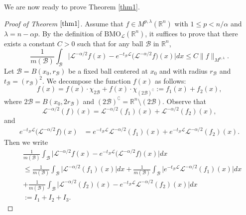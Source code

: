 \documentclass[10pt, reqno]{amsart}
\theoremstyle{definition}
\theoremstyle{remark}
\numberwithin{equation}{section}
\begin{document}
We are now ready to prove Theorem \ref{thm1}.
\begin{proof}[Proof of Theorem $\ref{thm1}$]
Assume that $f\in {M}^{p,\lambda}(\mathbb R^n)$ with $1\leq p<n/{\alpha}$ and $\lambda=n-\alpha p$. By the definition of $\mathrm{BMO}_{\mathcal{L}}(\mathbb R^n)$, it suffices to prove that there exists a constant $C>0$ such that for any ball $\mathcal{B}$ in $\mathbb R^n$,
\begin{equation}\label{main11}
\frac{1}{m(\mathcal{B})}\int_{\mathcal{B}}\big|\mathcal L^{-\alpha/2}f(x)-e^{-t_{\mathcal{B}}\mathcal{L}}
\big(\mathcal L^{-\alpha/2}f\big)(x)\big|dx\leq C\big\|f\big\|_{M^{p,\lambda}}.
\end{equation}
Let $\mathcal{B}=B(x_0,r_{\mathcal{B}})$ be a fixed ball centered at $x_0$ and with radius $r_{\mathcal{B}}$ and $t_{\mathcal{B}}=(r_{\mathcal{B}})^2$. We decompose the function $f(x)$ as follows:
\begin{equation*}
f(x)=f(x)\cdot\chi_{2\mathcal{B}}+f(x)\cdot\chi_{(2\mathcal{B})^{\complement}}:=f_1(x)+f_2(x),
\end{equation*}
where $2\mathcal{B}=B(x_0,2r_{\mathcal{B}})$ and $(2\mathcal{B})^{\complement}=\mathbb R^n\setminus(2\mathcal{B})$. Observe that
\begin{equation*}
\mathcal L^{-\alpha/2}(f)(x)=\mathcal{L}^{-\alpha/2}(f_1)(x)
+\mathcal{L}^{-\alpha/2}(f_2)(x),
\end{equation*}
and
\begin{equation*}
\begin{split}
e^{-t_{\mathcal{B}}\mathcal{L}}\big(\mathcal L^{-\alpha/2}f\big)(x)
&=e^{-t_{\mathcal{B}}\mathcal{L}}\mathcal{L}^{-\alpha/2}(f_1)(x)+
e^{-t_{\mathcal{B}}\mathcal{L}}\mathcal{L}^{-\alpha/2}(f_2)(x).
\end{split}
\end{equation*}
Then we write
\begin{equation*}
\begin{split}
&\frac{1}{m(\mathcal{B})}\int_{\mathcal{B}}\big|\mathcal L^{-\alpha/2}f(x)-e^{-t_{\mathcal{B}}\mathcal{L}}
\big(\mathcal L^{-\alpha/2}f\big)(x)\big|dx\\
&\leq\frac{1}{m(\mathcal{B})}\int_{\mathcal{B}}\big|\mathcal{L}^{-\alpha/2}(f_1)(x)\big|dx
+\frac{1}{m(\mathcal{B})}\int_{\mathcal{B}}\big|e^{-t_{\mathcal{B}}\mathcal{L}}\mathcal{L}^{-\alpha/2}(f_1)(x)\big|dx\\
&+\frac{1}{m(\mathcal{B})}\int_{\mathcal{B}}\big|\mathcal{L}^{-\alpha/2}(f_2)(x)-e^{-t_{\mathcal{B}}\mathcal{L}}\mathcal{L}^{-\alpha/2}(f_2)(x)\big|dx\\
&:=I_1+I_2+I_3.
\end{split}
\end{equation*}


\end{proof}
\end{document}
